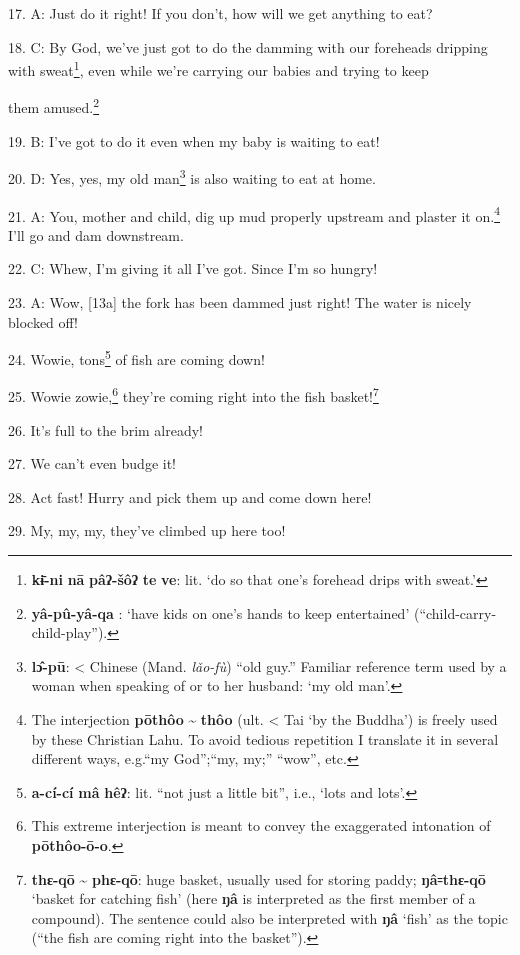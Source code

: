17. A: Just do it right! If you don't, how will we get anything to eat?

18. C: By God, we've just got to do the damming with our foreheads dripping with
sweat\footnote{\textbf{kɨ̄-ni} \textbf{nā} \textbf{pâʔ-šôʔ} \textbf{te} \textbf{ve}: lit. `do so that one's forehead drips with sweat.'}, even while we're carrying our babies and trying to keep

them amused.\footnote{\textbf{yâ-pû-yâ-qa} : `have kids on one's hands to keep entertained' (``child-carry-child-play'').}

19. B: I've got to do it even when my baby is waiting to eat!

20. D: Yes, yes, my old man\footnote{\textbf{lɔ̂-pū}: < Chinese (Mand. \textit{lǎo-fù}) ``old guy.'' Familiar reference term used by a woman when speaking of or to her husband: `my old man'.} is also waiting to eat at home.

21. A: You, mother and child, dig up mud properly upstream and plaster it on.\footnote{The interjection \textbf{pōthôo} \textasciitilde{} \textbf{thôo} (ult. < Tai `by the Buddha') is freely used by these Christian Lahu. To avoid tedious repetition I translate it in several different ways, e.g.``my God'';``my, my;'' ``wow'', etc.}
I'll go and dam downstream.

22. C: Whew, I'm giving it all I've got. Since I'm so hungry!

23. A: Wow, [13a] the fork has been dammed just right! The water is nicely blocked
off!

24. Wowie, tons\footnote{\textbf{a-cí-cí} \textbf{mâ} \textbf{hêʔ}: lit. ``not just a little bit'', i.e., `lots and lots'.} of fish are coming down!

25. Wowie zowie,\footnote{This extreme interjection is meant to convey the exaggerated intonation of \textbf{pōthôo-ō-o}.} they're coming right into the fish basket!\footnote{\textbf{thɛ-qō} \textasciitilde{} \textbf{phɛ-qō}: huge basket, usually used for storing paddy; \textbf{ŋâ꞊thɛ-qō} `basket for catching fish' (here \textbf{ŋâ} is interpreted as the first member of a compound). The sentence could also be interpreted with \textbf{ŋâ} `fish' as the topic (``the fish are coming right into the basket'').}

26. It's full to the brim already!

27. We can't even budge it!

28. Act fast! Hurry and pick them up and come down here!

29. My, my, my, they've climbed up here too!

